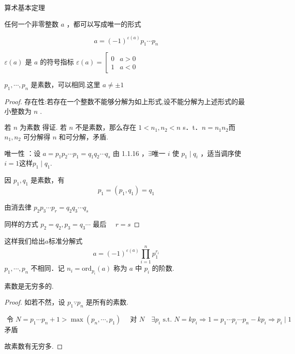 \begin{theorem}算术基本定理
	
	任何一个非零整数 $a$ ，都可以写成唯一的形式
	
	$$
	a=(-1)^{\varepsilon(a)} p_1 \cdots p_n
	$$
	
	$\varepsilon(a)$ 是 $a$ 的符号指标 $\varepsilon (a)=\left[\begin{array}{ll}0 & a>0 \\ 1 & a<0\end{array}\right.$ 
	
	$p_1, \cdots, p_n$ 是素数，可以相同.这里 $a\ne \pm1$
	
\end{theorem}
\begin{proof}
	存在性:若存在一个整数不能够分解为如上形式,设不能分解为上述形式的最小整数为 $n$ .
	
	若 $n$ 为素数 得证. 若 $n$ 不是素数，那么存在 $1<n_1, n_2<n $ s．t．$n=n_1n_2$而 $n_1, n_2$ 可分解得 $n$ 和可分解，矛盾.
	
	唯一性 ：设 $a=p_1 p_2 \cdots p_1=q_1 q_2 \cdots q_s$
	由 1.1.16 ，$\exists$唯一 $i$ 使 $p_1 \mid q_i$ ，适当调序使 $i=1 $这样$ p_1 \mid q_1$.
	
	因 $p_1, q_1$ 是素数，有
	$$p_1=\left(p_1, q_1\right)=q_1$$
	
	由消去律 $p_2 p_3 \cdots p_r=q_2 q_3 \cdots q_s$
	
	同样的方式 $p_2=q_2, p_3=q_3 \cdots$ 最后 $\quad r=s$
\end{proof}
这样我们给出$a$标准分解式
$$
a=(-1)^{\varepsilon(a)} \prod_{i=1}^{n}p_1^{r_i}
$$
$p_1, \cdots, p_n$ 不相同．记 $n_i=\text{ord}_{p_i}(a)$ 称为 $a$ 中 $p_i$ 的阶数.
\begin{theorem}
	素数是无穷多的.
	
	
	
	
\end{theorem}
\begin{proof}
	如若不然，设 $p_1 \because p_n$ 是所有的素数.
	
	$\text { 令 } N=p_1 \cdots p_n+1>\max(p_n, \cdots, p_1 )\quad \text { 对 } N \quad \exists p_i \text { s.t. } N=k p_i\Rightarrow1=p_1\cdots p_i\cdots p_n-kp_i\Rightarrow p_i\mid1
	$
	矛盾
	
	故素数有无穷多.
	
\end{proof}
